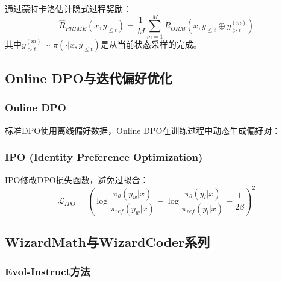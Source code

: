 \documentclass[12pt,a4paper]{article}
\newenvironment{algorithmic}[1][]%
      {\begin{list}{}{\leftmargin=2em\itemsep=0.2em\parsep=0pt\topsep=0.2em}}%
      {\end{list}}
\newcommand{\STATE}{\item[]}
\newcommand{\FOR}[1]{\item[]\textbf{for} ##1 \textbf{do}}
\newcommand{\ENDFOR}{\item[]\textbf{end for}}
\begin{document}
通过蒙特卡洛估计隐式过程奖励：
\begin{equation}
\hat{R}_{PRIME}(x, y_{\leq t}) = \frac{1}{M}\sum_{m=1}^{M} R_{ORM}(x, y_{\leq t} \oplus y_{>t}^{(m)})
\end{equation}
其中$y_{>t}^{(m)} \sim \pi(\cdot|x, y_{\leq t})$是从当前状态采样的完成。

\subsection{Online DPO与迭代偏好优化}

\subsubsection{Online DPO}

标准DPO使用离线偏好数据，Online DPO在训练过程中动态生成偏好对：


\subsubsection{IPO (Identity Preference Optimization)}

IPO修改DPO损失函数，避免过拟合：
\begin{equation}
\mathcal{L}_{IPO} = \left(\log\frac{\pi_\theta(y_w|x)}{\pi_{ref}(y_w|x)} - \log\frac{\pi_\theta(y_l|x)}{\pi_{ref}(y_l|x)} - \frac{1}{2\beta}\right)^2
\end{equation}

\subsection{WizardMath与WizardCoder系列}

\subsubsection{Evol-Instruct方法}
\end{document}
